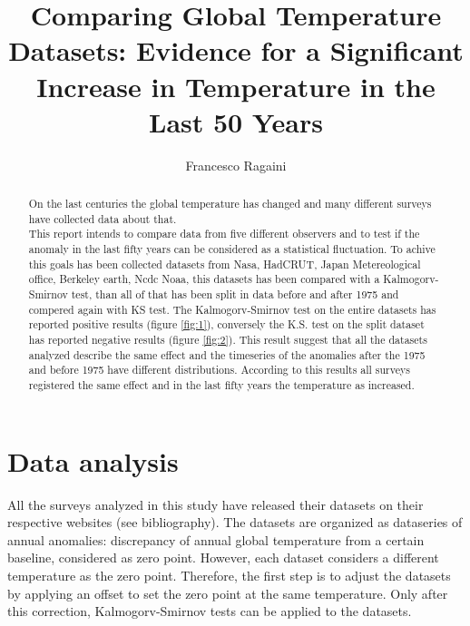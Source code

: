 \documentclass[a4paper,11pt,rmp,superscriptaddress]{revtex4}
\begin{document}
\title{Comparing Global Temperature Datasets: Evidence for a Significant Increase in Temperature in the Last 50 Years}
\author{Francesco Ragaini}
\begin{abstract}

On the last centuries the global temperature has changed and many different surveys have collected data about that.\\
This report intends to compare data from five different observers and to test if the anomaly in the last fifty years 
can be considered as a statistical fluctuation.
To achive this goals has been collected datasets from Nasa, HadCRUT, Japan Metereological office, Berkeley earth, Ncdc Noaa, 
this datasets has been compared with a Kalmogorv-Smirnov test, than all of that has been split in data before and after 1975 and compered 
again with KS test.
The Kalmogorv-Smirnov test on the entire datasets has reported positive results (figure \ref*{fig:1}), conversely the K.S. test 
on the split dataset has reported negative results (figure \ref*{fig:2}).
This result suggest that all the datasets analyzed describe the same effect and the timeseries of the anomalies after the 1975 and 
before 1975 have different distributions. According to this results all surveys registered the same effect
and in the last fifty years the temperature as increased.
\end{abstract}

\maketitle
\section*{Data analysis}
All the surveys analyzed in this study have released their datasets on their respective websites (see bibliography). 
The datasets are organized as dataseries of annual anomalies: discrepancy of annual global temperature from a certain baseline, 
considered as zero point.
However, each dataset considers a different temperature as the zero point. Therefore, 
the first step is to adjust the datasets by applying an offset to set the zero point at the same temperature. 
Only after this correction, Kalmogorv-Smirnov tests can be applied to the datasets.
\end{document}
